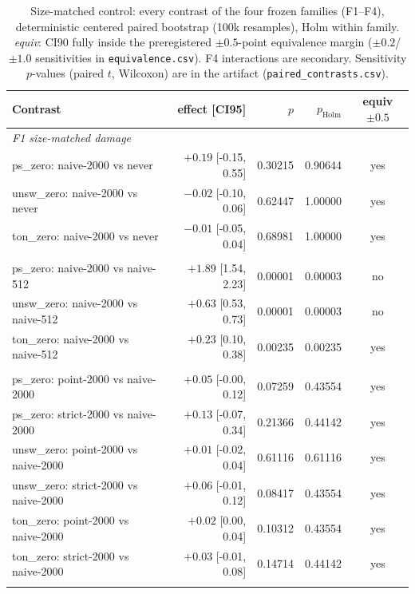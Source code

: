 \begin{table}
\centering
\caption{Size-matched control: every contrast of the four frozen families (F1--F4),
deterministic centered paired bootstrap (100k resamples), Holm within family.
\emph{equiv}: CI90 fully inside the preregistered $\pm0.5$-point equivalence margin
($\pm0.2$/$\pm1.0$ sensitivities in \texttt{equivalence.csv}). F4 interactions are
secondary. Sensitivity $p$-values (paired $t$, Wilcoxon) are in the artifact
(\texttt{paired\_contrasts.csv}).}
\label{tab:size_matched_supp_contrasts}
\scriptsize
\begin{tabular}{l r r r c}
\toprule
Contrast & effect [CI95] & $p$ & $p_{\mathrm{Holm}}$ & equiv $\pm0.5$ \\
\midrule
\multicolumn{5}{l}{\emph{F1 size-matched damage}} \\
ps\_zero: naive-2000 vs never & $+0.19$ [-0.15, 0.55] & 0.30215 & 0.90644 & yes \\
unsw\_zero: naive-2000 vs never & $-0.02$ [-0.10, 0.06] & 0.62447 & 1.00000 & yes \\
ton\_zero: naive-2000 vs never & $-0.01$ [-0.05, 0.04] & 0.68981 & 1.00000 & yes \\
\addlinespace
\multicolumn{5}{l}{\emph{F2 candidate-size effect}} \\
ps\_zero: naive-2000 vs naive-512 & $+1.89$ [1.54, 2.23] & 0.00001 & 0.00003 & no \\
unsw\_zero: naive-2000 vs naive-512 & $+0.63$ [0.53, 0.73] & 0.00001 & 0.00003 & no \\
ton\_zero: naive-2000 vs naive-512 & $+0.23$ [0.10, 0.38] & 0.00235 & 0.00235 & yes \\
\addlinespace
\multicolumn{5}{l}{\emph{F3 gate value at size 2000}} \\
ps\_zero: point-2000 vs naive-2000 & $+0.05$ [-0.00, 0.12] & 0.07259 & 0.43554 & yes \\
ps\_zero: strict-2000 vs naive-2000 & $+0.13$ [-0.07, 0.34] & 0.21366 & 0.44142 & yes \\
unsw\_zero: point-2000 vs naive-2000 & $+0.01$ [-0.02, 0.04] & 0.61116 & 0.61116 & yes \\
unsw\_zero: strict-2000 vs naive-2000 & $+0.06$ [-0.01, 0.12] & 0.08417 & 0.43554 & yes \\
ton\_zero: point-2000 vs naive-2000 & $+0.02$ [0.00, 0.04] & 0.10312 & 0.43554 & yes \\
ton\_zero: strict-2000 vs naive-2000 & $+0.03$ [-0.01, 0.08] & 0.14714 & 0.44142 & yes \\
\addlinespace

\end{tabular}
\end{table}
